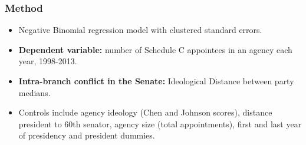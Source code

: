 \documentclass{beamer}
\begin{document}
\begin{frame}
\frametitle{Method}
\begin{itemize}\addtolength{\itemsep}{0.25\baselineskip}
\item Negative Binomial regression model with clustered standard errors.
\item \textbf{Dependent variable:} number of Schedule C appointees in an agency each year, 1998-2013.
\item \textbf{Intra-branch conflict in the Senate:} Ideological Distance between party medians.
\item Controls include agency ideology (Chen and Johnson scores), distance president to 60th senator, agency size (total appointments), first and last year of presidency and president dummies. 
\end{itemize}
\end{frame}

\end{document}
